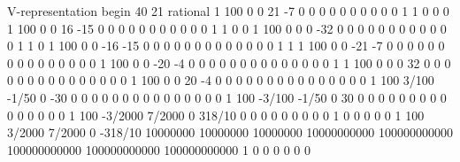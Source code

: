 V-representation
begin
 40 21 rational
 1  100    0    0                21   -7          0         0         0            0             0             0             0             0        0         0         1         1          0          0           0
 1  100    0    0                16  -15          0         0         0            0             0             0             0             0        0         0         0         1          1          0           0
 1  100    0    0                 0  -32          0         0         0            0             0             0             0             0        0         0         0         0          1          1           0
 1  100    0    0               -16  -15          0         0         0            0             0             0             0             0        0         0         0         0          0          1           1
 1  100    0    0               -21   -7          0         0         0            0             0             0             0             0        0         0         0         0          0          0           0
 1  100    0    0               -20   -4          0         0         0            0             0             0             0             0        0         0         0         0          0          0           1
 1  100    0    0                 0   32          0         0         0            0             0             0             0             0        0         0         0         0          0          0           0
 1  100    0    0                20   -4          0         0         0            0             0             0             0             0        0         0         0         0          0          0           0
 1  100    3/100   -1/50          0  -30          0         0         0            0             0             0             0             0        0         0         0         0          0          0           0
 1  100   -3/100   -1/50          0   30          0         0         0            0             0             0             0             0        0         0         0         0          0          0           0
 1  100   -3/2000    7/2000    0  318/10          0         0         0            0             0             0             0             0        0         1         0         0          0          0           0
 1  100    3/2000    7/2000    0 -318/10   10000000  10000000  10000000  10000000000  100000000000  100000000000  100000000000  100000000000        1         0         0         0          0          0           0

